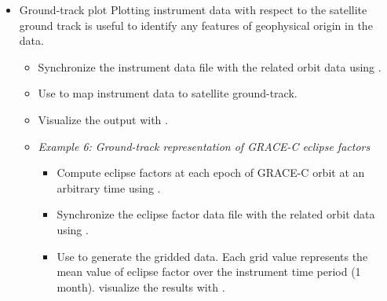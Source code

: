 \begin{itemize}
\item Ground-track plot
Plotting instrument data with respect to the satellite ground track is useful to identify any features of geophysical origin in the data.
\begin{itemize}
\item Synchronize the instrument data file with the related orbit data using .
\item Use  to map instrument data to satellite ground-track.
\item Visualize the output with .
\item \emph{Example 6: Ground-track representation of GRACE-C eclipse factors}
  \begin{itemize}
  \item Compute eclipse factors at each epoch of GRACE-C orbit at an arbitrary time using .
  \item Synchronize the eclipse factor data file with the related orbit data using .
  \item Use  to generate the gridded data. Each grid value represents the mean value of eclipse factor over the instrument time period (1 month).  visualize the results with .
  \end{itemize}
\end{itemize}

\end{itemize}
